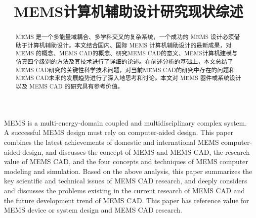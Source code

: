 \documentclass[no-math]{YangThesis}
\title{MEMS计算机辅助设计研究现状综述}
\begin{document}
\maketitle

\setcounter{page}{1}
 
\begin{abstract}
 
MEMS 是一个多能量域耦合、多学科交叉的复杂系统，一个成功的 MEMS 设计必须借助于计算机辅助设计。本文结合国内、国际 MEMS 计算机辅助设计的最新成果，对 MEMS 的概念、MEMS CAD的概念、研究MEMS CAD的意义、MEMS计算机建模与仿真四个级别的方法及其技术进行了详细的论述。在前述分析的基础上，本文总结了MEMS CAD研究的关键性科学技术问题，对当前MEMS CAD的研究中存在的问题和MEMS CAD未来的发展趋势进行了深入地思考和讨论。本文对 MEMS 器件或系统设计以及 MEMS CAD 的研究具有参考价值。

\end{abstract}

\begin{abstracten}

MEMS is a multi-energy-domain coupled and multidisciplinary complex system. A successful MEMS design must rely on computer-aided design. This paper combines the latest achievements of domestic and international MEMS computer-aided design, and discusses the concept of MEMS and MEMS CAD, the research value  of MEMS CAD, and the four concepts and techniques of MEMS computer modeling and simulation. Based on the above analysis, this paper summarizes the key scientific and technical issues of MEMS CAD research, and deeply considers and discusses the problems existing in the current research of MEMS CAD and the future development trend of MEMS CAD. This paper has reference value for MEMS device or system design and MEMS CAD research.

\end{abstracten}

\vspace{-1.3cm}

\tableofcontents
\end{document}
